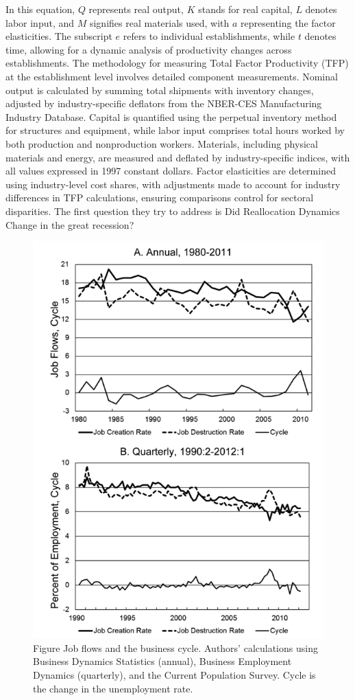 \documentclass[12pt]{article}
\begin{document}
In this equation, \(Q\) represents real output, \(K\) stands for real capital, \(L\) denotes labor input, and \(M\)
signifies real materials used, with \(a\) representing the factor elasticities. The subscript \(e\) refers to individual
establishments, while \(t\) denotes time, allowing for a dynamic analysis of productivity changes across establishments. 
The methodology for measuring Total Factor Productivity (TFP) at the establishment level involves detailed component
measurements. Nominal output is calculated by summing total shipments with inventory
changes, adjusted by industry-specific deflators from the NBER-CES Manufacturing Industry Database. Capital is
quantified using the perpetual inventory method for structures and equipment, while labor input comprises total hours
worked by both production and nonproduction workers. Materials, including physical materials and energy, are measured
and deflated by industry-specific indices, with all values expressed in 1997 constant dollars. Factor elasticities are
determined using industry-level cost shares, with adjustments made to account for industry differences in TFP
calculations, ensuring comparisons control for sectoral disparities. 
The first question they try to address is Did Reallocation Dynamics Change in the great recession?
\begin{figure}
    \centering
    \includegraphics[scale = 0.6]{Plot1.1.png}
    \caption{Figure Job ﬂows and the business cycle. Authors' calculations using Business
    Dynamics Statistics (annual), Business Employment Dynamics (quarterly), and
    the Current Population Survey. Cycle is the change in the unemployment rate.
    }
    \label{plot:1.1}
\end{figure}
\end{document}
